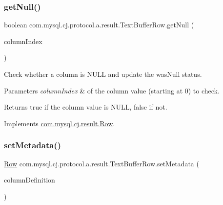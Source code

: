 \subsubsection{\texorpdfstring{get\+Null()}{getNull()}}
{\footnotesize\ttfamily boolean com.\+mysql.\+cj.\+protocol.\+a.\+result.\+Text\+Buffer\+Row.\+get\+Null (\begin{DoxyParamCaption}\item[{int}]{column\+Index }\end{DoxyParamCaption})}

Check whether a column is N\+U\+LL and update the \textquotesingle{}was\+Null\textquotesingle{} status.


\begin{DoxyParams}{Parameters}
{\em column\+Index} & of the column value (starting at 0) to check.\\
\hline
\end{DoxyParams}
\begin{DoxyReturn}{Returns}
true if the column value is N\+U\+LL, false if not. 
\end{DoxyReturn}


Implements \mbox{\hyperlink{interfacecom_1_1mysql_1_1cj_1_1result_1_1_row_aaf07357d53c30067dfa87183a1e60a18}{com.\+mysql.\+cj.\+result.\+Row}}.

\mbox{\label{classcom_1_1mysql_1_1cj_1_1protocol_1_1a_1_1result_1_1_text_buffer_row_a09f38001a62bec7e4723062fb7b1c156}} 
\subsubsection{\texorpdfstring{set\+Metadata()}{setMetadata()}}
{\footnotesize\ttfamily \mbox{\hyperlink{interfacecom_1_1mysql_1_1cj_1_1result_1_1_row}{Row}} com.\+mysql.\+cj.\+protocol.\+a.\+result.\+Text\+Buffer\+Row.\+set\+Metadata (\begin{DoxyParamCaption}\item[{\mbox{\hyperlink{interfacecom_1_1mysql_1_1cj_1_1protocol_1_1_column_definition}{Column\+Definition}}}]{column\+Definition }\end{DoxyParamCaption})}

